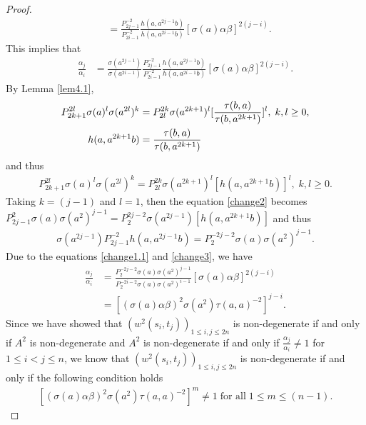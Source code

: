 \documentclass[a4paper,11pt]{amsart}
\numberwithin{equation}{section}
\begin{document}
\begin{proof}
\begin{align*}
&=\frac{P_{2j-1}^{-2}}{P_{2i-1}^{-2}} \frac{h(a,a^{2j-1}b)}{h(a,a^{2i-1}b)} [\sigma(a) \alpha \beta]^{2(j-i)}.
\end{align*}
This implies that
\begin{align}
\label{change1.1} \frac{\alpha_j}{\alpha_i}&=\frac{\sigma(a^{2j-1})} {\sigma(a^{2i-1})} \frac{P_{2j-1}^{-2}}{P_{2i-1}^{-2}} \frac{h(a,a^{2j-1}b)}{h(a,a^{2i-1}b)} [\sigma(a) \alpha \beta]^{2(j-i)}.
\end{align}
By Lemma \ref{lem4.1},
\begin{align}
\label{change1} P_{2k+1}^{2l}\sigma(a)^l\sigma(a^{2l})^k&=P_{2l}^{2k}\sigma(a^{2k+1})^l
[\frac{\tau(b,a)}{\tau(b,a^{2k+1})}]^l,\;k,l\geq 0,\\
h(a,a^{2k+1}b)&=\frac{\tau(b,a)}{\tau(b,a^{2k+1})}\notag
\end{align}
and thus
\begin{align}
\label{change2} P_{2k+1}^{2l}\sigma(a)^l\sigma(a^{2l})^k=P_{2l}^{2k}\sigma(a^{2k+1})^l
[h(a,a^{2k+1}b)]^l,\;k,l\geq 0.
\end{align}
Taking $k=(j-1)$ and $l=1$, then the equation \eqref{change2} becomes $P_{2j-1}^{2}\sigma(a)\sigma(a^{2})^{j-1}=P_{2}^{2j-2}\sigma(a^{2j-1})
[h(a,a^{2k+1}b)]$ and thus
\begin{align}
\label{change3} \sigma(a^{2j-1}) P_{2j-1}^{-2} h(a,a^{2j-1}b)=P_{2}^{-2j-2} \sigma(a) \sigma(a^2)^{j-1}.
\end{align}
Due to the equations \eqref{change1.1} and \eqref{change3}, we have
\begin{align*}
 \frac{\alpha_j}{\alpha_i}&=\frac{P_{2}^{-2j-2} \sigma(a) \sigma(a^2)^{j-1}} {P_{2}^{-2i-2} \sigma(a) \sigma(a^2)^{i-1}} [\sigma(a) \alpha \beta]^{2(j-i)}\\
&=[(\sigma(a)\alpha\beta)^2 \sigma(a^2) \tau(a,a)^{-2}]^{j-i}.
\end{align*}
Since we have showed that $(w^2(s_i,t_j))_{1\leq i,j \leq 2n}$ is non-degenerate if and only if $A^2$ is non-degenerate and $A^2$ is non-degenerate if and only if $\frac{\alpha_j}{\alpha_i}\neq 1$ for $1\leq i < j\leq n$, we know that $(w^2(s_i,t_j))_{1\leq i,j \leq 2n}$ is non-degenerate if and only if the following condition holds
\begin{gather}
\label{non-deg-w2}[(\sigma(a) \alpha \beta)^2 \sigma(a^2) \tau(a,a)^{-2}]^m \neq 1\;\text{for all} \;1 \leq m \leq (n-1).
\end{gather}


\end{proof}
\end{document}
